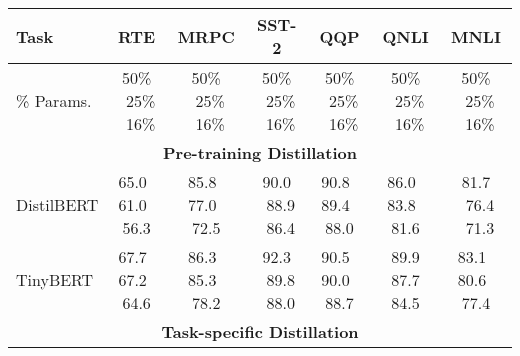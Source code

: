 \begin{table*}[t]
	\centering
        \scriptsize
	\begin{tabular}{l|cccccc}
				\toprule
		Task &\textbf{RTE} &\textbf{MRPC}  & \textbf{SST-2}                                                  & \textbf{QQP}                                                    & \textbf{QNLI}                                                & \textbf{MNLI}                                                    \\
				\midrule
		\% Params.   &50\% ~25\%  ~16\% &50\% ~25\%  ~16\%      &50\% ~25\%  ~16\%             &50\% ~25\%  ~16\%            &50\% ~25\%  ~16\%            &50\% ~25\%  ~16\%        \\
\midrule
		\multicolumn{7}{c}{\textbf{Pre-training Distillation}}   \\
\midrule
		DistilBERT  &65.0~ 61.0~ 56.3 &85.8~ 77.0~ 72.5     & 90.0 ~88.9 ~86.4          & 90.8~ 89.4~ 88.0          & 86.0~ 83.8~ 81.6         & 81.7 ~76.4 ~71.3         \\
		TinyBERT    &67.7~ 67.2~ 64.6 &86.3~ 85.3~ 78.2    & 92.3 ~89.8 ~88.0          & 90.5~ 90.0~ 88.7          & 89.9 ~87.7~ 84.5          & 83.1~ 80.6~ 77.4           \\
	\midrule
		\multicolumn{7}{c}{\textbf{Task-specific Distillation}}   \\
  	\midrule


\end{tabular}
\end{table*}
